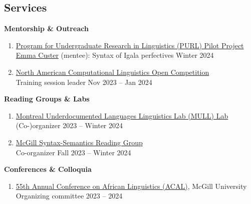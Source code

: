 \documentclass[margin,line]{resume}
\begin{document}
\begin{resume}
\begin{comment}
	\vspace{-0.6em}\rule{\textwidth}{0.4pt}
	\end{comment}


	\section{\mysidestyle Services}


	\textbf{Mentorship \& Outreach}
	\begin{enumerate}[-, leftmargin=1em, topsep=0.5pt]
		\item[] \href{https://www.mcgill.ca/cogsci/research/cogs396}{Program for Undergraduate Research in Linguistics (PURL) Pilot Project}\\
		      \hphantom{...}\href{https://www.linkedin.com/in/emma-custer-648345252}{Emma Custer} (mentee): Syntax of Igala perfectives \hfill Winter 2024

		\item[] \href{https://naclo.org/}{North American Computational Linguistics Open Competition}\\
		      \hphantom{...}Training session leader \hfill Nov 2023 -- Jan 2024
	\end{enumerate}

	\textbf{Reading Groups \& Labs}
	\begin{enumerate}[-, leftmargin=1em, topsep=0.5pt]
		\item[] \href{https://mcling.blogs.mcgill.ca/category/mull-lab/}{Montreal Underdocumented Languages Linguistics Lab (MULL) Lab}\\
		      \hphantom{...}(Co-)organizer \hfill 2023 -- Winter 2024

		\item[] \href{https://mcling.blogs.mcgill.ca/category/syntax-semantics-group/}{McGill Syntax-Semantics Reading Group}\\
		      \hphantom{...}Co-organizer \hfill Fall 2023 -- Winter 2024
	\end{enumerate}

	\textbf{Conferences \& Colloquia}
	\begin{enumerate}[-, leftmargin=1em, topsep=0.5pt]
		\item[] \href{https://acal55.mull-lab.org/}{55th Annual Conference on African Linguistics (ACAL)}, McGill University\\
		      \hphantom{...}Organizing committee \hfill 2023 -- 2024


\end{enumerate}
\end{resume}
\end{document}

